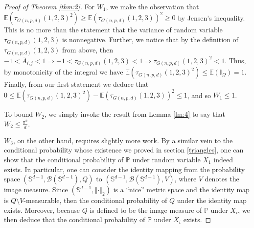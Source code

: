 \documentclass{article}
\begin{document}
\begin{proof}[Proof of Theorem \ref{thm:2}]
For $W_1$, we make the observation that $\mathbb{E}\left( \tau_{G(n,p,d)}(1,2,3)^2 \right) \geq \mathbb{E}\left(\tau_{G(n,p,d)}(1,2,3) \right)^2 \geq 0$ by Jensen's inequality. This is no more than the statement that the variance of random variable $\tau_{G(n,p,d)}(1,2,3)$ is nonnegative. Further, we notice that by the definition of $\tau_{G(n,p,d)}(1,2,3)$ from above, then  $-1 < \overline{A}_{i, j} < 1 \Rightarrow  -1 < \tau_{G(n,p,d)}(1,2,3) < 1 \Rightarrow \tau_{G(n,p,d)}(1,2,3)^2 < 1$. Thus, by monotonicity of the integral we have $\mathbb{E}\left( \tau_{G(n,p,d)}(1,2,3)^2 \right) \leq \mathbb{E}\left( \mathbb{I}_{\Omega} \right) = 1$. Finally, from our first statement we deduce that $0 \leq \mathbb{E}\left( \tau_{G(n,p,d)}(1,2,3)^2 \right) - \mathbb{E}\left(\tau_{G(n,p,d)}(1,2,3) \right)^2 \leq 1$, and so $W_1 \leq 1$.

To bound $W_2$, we simply invoke the result from Lemma \ref{lm:4} to say that $W_2 \leq \frac{\pi^2}{d}$.

$W_3$, on the other hand, requires slightly more work. By a similar vein to the conditional probability whose existence we proved in section \ref{triangles}, one can show that the conditional probability of $\mathbb{P}$ under random variable $X_1$ indeed exists. In particular, one can consider the identity mapping from the probability space $(\mathbb{S}^{d-1}, \mathcal{B}(\mathbb{S}^{d-1}), Q)$ to $(\mathbb{S}^{d-1}, \mathcal{B}(\mathbb{S}^{d-1}), V)$, where $V$ denotes the image measure. Since $(\mathbb{S}^{d-1}, \left\Vert \cdot \right\Vert_2)$ is a \enquote{nice} metric space and the identity map is $Q \setminus V$-measurable, then the conditional probability of $Q$ under the identity map exists. Moreover, because $Q$ is defined to be the image measure of $\mathbb{P}$ under $X_i$, we then deduce that the conditional probability of $\mathbb{P}$ under $X_i$ exists.


\end{proof}
\end{document}
